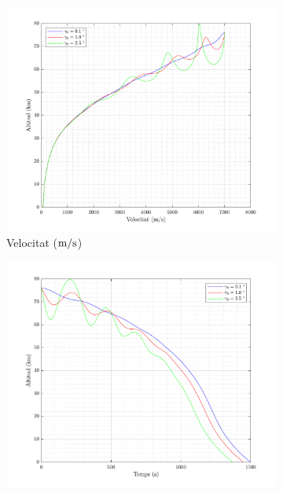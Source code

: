 \begin{figure}[ht]
    \centering
    \begin{subfigure}[t]{.33\textwidth}
        \centering
        \includegraphics[width=\linewidth]{imagenes/02_lifting_graficas/velocitat_no_title.pdf}
        \caption{Velocitat ($\meter/\second$)}
    \end{subfigure}%
    \begin{subfigure}[t]{.33\textwidth}
        \centering
        \includegraphics[width=\linewidth]{imagenes/02_lifting_graficas/temps_no_title.pdf}

\end{subfigure}
\end{figure}
